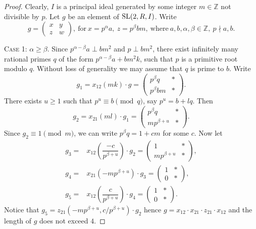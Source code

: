 \begin{proof}
Clearly, $I$ is a principal ideal generated by some integer $m\in\mathbb{Z}$ not divisible by $p$.
Let $g$ be an element of $\operatorname{SL}(2,R,I)$. Write
\[ g=\begin{pmatrix}x & y \\ z & w\end{pmatrix},\ \text{for}\ x=p^\alpha a,\ z=p^\beta bm,\ \text{where}\ a,b,\alpha,\beta\in\mathbb{Z},\ p\nmid a,b. \]

\textsc{Case 1:} $\alpha\geqslant\beta$. 
Since $p^{\alpha-\beta}a\perp bm^2$ and $p\perp bm^2$, there exist infinitely many rational primes $q$ of the form $p^{\alpha-\beta}a+bm^2k$,
such that $p$ is a primitive root modulo $q$. 
Without loss of generality we may assume that $q$ is prime to $b$. 
Write
\[ g_1=x_{12}(mk)\cdot g =
\begin{pmatrix} p^\beta q & * \\ p^\beta bm & * \end{pmatrix}.\]
There exists $u\geqslant 1$ such that $p^u\equiv b\pmod q$, say $p^u=b+lq$. Then
\[ g_2 =  x_{21}(ml)\cdot g_1 =
\begin{pmatrix} p^\beta q & * \\ mp^{\beta+u} & * \end{pmatrix}. \]
Since $g_2\equiv 1\pmod m$, we can write $p^\beta q=1+cm$ for some $c$. Now let
\begin{align*}
g_3 = & x_{12}\left(\dfrac{-c}{p^{\beta+u}}\right)\cdot g_2 =
\begin{pmatrix} 1 & * \\ mp^{\beta+u} & * \end{pmatrix}, \\
g_4 = & x_{21}\left(-mp^{\beta+u}\right)\cdot g_3 =
\begin{pmatrix} 1 & * \\ 0 & * \end{pmatrix}, \\
g_5 = & x_{12}\left(\dfrac{c}{p^{\beta+u}}\right)\cdot g_4 =
\begin{pmatrix} 1 & * \\ 0 & * \end{pmatrix}.
\end{align*}
Notice that $g_5=z_{21}\left(-mp^{\beta+u},c/p^{\beta+u}\right)\cdot g_2$ hence $g=x_{12} \cdot x_{21} \cdot z_{21} \cdot x_{12}$
and the length of $g$ does not exceed $4$.


\end{proof}
